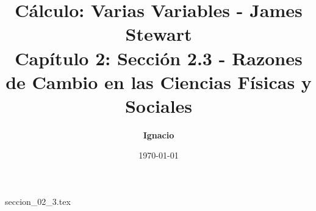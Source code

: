 \documentclass[11pt,spanish,oneside]{report}
\title{\textbf{Cálculo: Varias Variables - James Stewart} \\ \Large Capítulo 2: Sección 2.3 - Razones de Cambio en las Ciencias Físicas y Sociales}
\author{\textbf{Ignacio}}
\date{\today}
\begin{document}
\maketitle

{seccion_02_3.tex}
\end{document}
